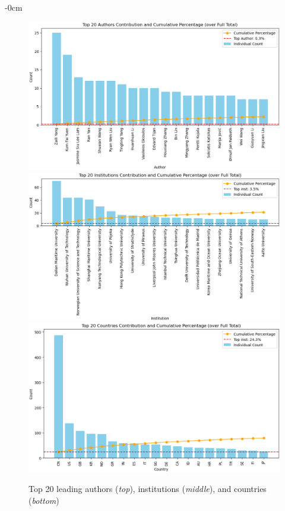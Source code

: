 \documentclass[jmse,review,submit,pdftex,moreauthors]{Definitions/mdpi}
\begin{document}
\begin{adjustwidth}{-\extralength}{0cm}
\begin{figure}[H]
	\centering
	\includegraphics[height=0.3\textheight, keepaspectratio]{pics/leading_authors.eps}
	\includegraphics[height=0.3\textheight, keepaspectratio]{pics/leading_institutions.eps}
	\includegraphics[height=0.3\textheight, keepaspectratio]{pics/leading_countries.eps}
	\caption{Top 20 leading authors (\textit{top}), institutions (\textit{middle}), and countries (\textit{bottom})}\label{fig:fig2}
\end{figure}


\end{adjustwidth}
\end{document}
